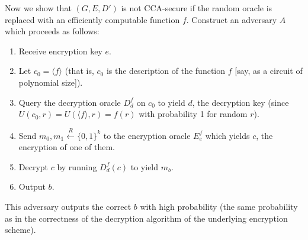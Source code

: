 \documentclass[draft]{article}
\newcommand{\getr}{\overset{R}{\gets}}
\begin{document}
\begin{enumerate}
  Now we show that $(G, E, D')$ is not CCA-secure if the random oracle is replaced with an efficiently computable function $f$.
  Construct an adversary $A$ which proceeds as follows:
  \begin{enumerate}
  \item Receive encryption key $e$.
  \item Let $c_0 = \langle f \rangle$ (that is, $c_0$ is the description of the function $f$ [say, as a circuit of polynomial size]).
  \item Query the decryption oracle $D_d^f$ on $c_0$ to yield $d$, the decryption key (since $U(c_0, r)=U(\langle f \rangle, r)=f(r)$ with probability 1 for random $r$).
  \item Send $m_0, m_1\getr\{0, 1\}^{k}$ to the encryption oracle $E_e^f$ which yields $c$, the encryption of one of them.
  \item Decrypt $c$ by running $D_d^f(c)$ to yield $m_b$.
  \item Output $b$.
  \end{enumerate}
  This adversary outputs the correct $b$ with high probability (the same probability as in the correctness of the decryption algorithm of the underlying encryption scheme).
\end{enumerate}
\end{document}
